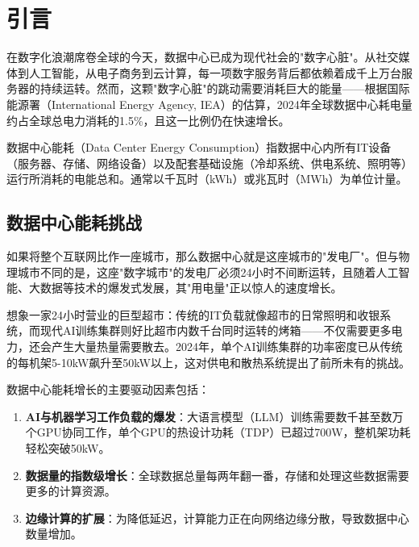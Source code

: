 
\section{引言}\label{sec:green-intro}

在数字化浪潮席卷全球的今天，数据中心已成为现代社会的"数字心脏"。从社交媒体到人工智能，从电子商务到云计算，每一项数字服务背后都依赖着成千上万台服务器的持续运转。然而，这颗"数字心脏"的跳动需要消耗巨大的能量——根据国际能源署（International Energy Agency, IEA）的估算，2024年全球数据中心耗电量约占全球总电力消耗的1.5\%，且这一比例仍在快速增长。

\begin{definition}[数据中心能耗]
数据中心能耗（Data Center Energy Consumption）指数据中心内所有IT设备（服务器、存储、网络设备）以及配套基础设施（冷却系统、供电系统、照明等）运行所消耗的电能总和。通常以千瓦时（kWh）或兆瓦时（MWh）为单位计量。
\end{definition}

\subsection{数据中心能耗挑战}

如果将整个互联网比作一座城市，那么数据中心就是这座城市的"发电厂"。但与物理城市不同的是，这座"数字城市"的发电厂必须24小时不间断运转，且随着人工智能、大数据等技术的爆发式发展，其"用电量"正以惊人的速度增长。

\begin{analogy}
想象一家24小时营业的巨型超市：传统的IT负载就像超市的日常照明和收银系统，而现代AI训练集群则好比超市内数千台同时运转的烤箱——不仅需要更多电力，还会产生大量热量需要散去。2024年，单个AI训练集群的功率密度已从传统的每机架5-10kW飙升至50kW以上，这对供电和散热系统提出了前所未有的挑战。
\end{analogy}

数据中心能耗增长的主要驱动因素包括：

\begin{enumerate}
    \item \textbf{AI与机器学习工作负载的爆发}：大语言模型（LLM）训练需要数千甚至数万个GPU协同工作，单个GPU的热设计功耗（TDP）已超过700W，整机架功耗轻松突破50kW。
    \item \textbf{数据量的指数级增长}：全球数据总量每两年翻一番，存储和处理这些数据需要更多的计算资源。
    \item \textbf{边缘计算的扩展}：为降低延迟，计算能力正在向网络边缘分散，导致数据中心数量增加。
\end{enumerate}

